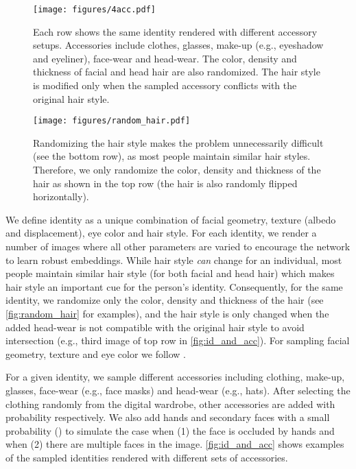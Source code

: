 \documentclass[10pt,twocolumn,letterpaper]{article}
\begin{document}
\begin{figure}[t]
\begin{center}
\texttt{[image: figures/4acc.pdf]}
\end{center}
\caption{Each row shows the same identity rendered with different accessory setups. Accessories include clothes, glasses, make-up (e.g., eyeshadow and eyeliner), face-wear and head-wear. The color, density and thickness of facial and head hair are also randomized. The hair style is modified only when the sampled accessory conflicts with the original hair style.}
\label{fig:id_and_acc}
\end{figure}

\begin{figure}[t]
\begin{center}
\texttt{[image: figures/random\_hair.pdf]}
\end{center}
\caption{Randomizing the hair style makes the problem unnecessarily difficult (see the bottom row), as most people maintain similar hair styles. Therefore, we only randomize the color, density and thickness of the hair as shown in the top row (the hair is also randomly flipped horizontally).}
\label{fig:random_hair}
\end{figure}

We define identity as a unique combination of facial geometry, texture (albedo and displacement), eye color and hair style.
For each identity, we render a number of images where all other parameters are varied to encourage the network to learn robust embeddings. 
While hair style \textit{can} change for an individual, most people maintain similar hair style (for both facial and head hair) which makes hair style an important cue for the person's identity. 
Consequently, for the same identity, we randomize only the color, density and thickness of the hair (see \autoref{fig:random_hair} for examples), and the hair style is only changed when the added head-wear is not compatible with the original hair style to avoid intersection (e.g., third image of top row in \autoref{fig:id_and_acc}).
For sampling facial geometry, texture and eye color we follow \cite{2021_FakeItMakeIt}.

For a given identity, we sample different accessories including clothing, make-up, glasses, face-wear (e.g., face masks) and head-wear (e.g., hats).
After selecting the clothing randomly from the digital wardrobe, other accessories are added with probability  respectively.
We also add hands and secondary faces with a small probability () to simulate the case when (1) the face is occluded by hands and when (2) there are multiple faces in the image.
\autoref{fig:id_and_acc} shows examples of the sampled identities rendered with different sets of accessories.
\end{document}
